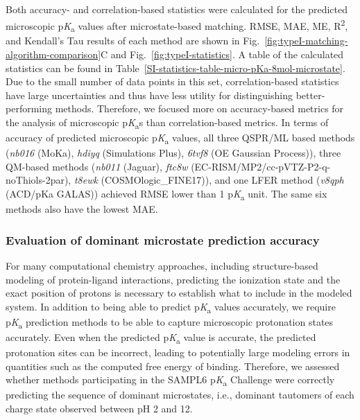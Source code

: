 \documentclass[9pt,lineno,final]{elife}
\newcommand{\pKa}{p\textit{K}\textsubscript{a}}
\begin{document}
Both accuracy- and correlation-based statistics were calculated for the predicted microscopic \pKa{} values after microstate-based matching. 
RMSE, MAE, ME, R\textsuperscript{2}, and Kendall's Tau results of each method are shown in Fig.~\ref{fig:typeI-matching-algorithm-comparison}C and Fig.~\ref{fig:typeI-statistics}. 
A table of the calculated statistics can be found in Table~\ref{SI-statistics-table-micro-pKa-8mol-microstate}. 
Due to the small number of data points in this set, correlation-based statistics have large uncertainties and thus have less utility for distinguishing better-performing methods. 
Therefore, we focused more on accuracy-based metrics for the analysis of microscopic \pKa{}s than correlation-based metrics. 
In terms of accuracy of predicted microscopic \pKa{} values, all three QSPR/ML based methods (\textit{nb016} (MoKa), \textit{hdiyq} (Simulations Plus), \textit{6tvf8} (OE Gaussian Process)), three QM-based methods (\textit{nb011} (Jaguar), \textit{ftc8w} (EC-RISM/MP2/cc-pVTZ-P2-q-noThiols-2par), \textit{t8ewk} (COSMOlogic\_FINE17)), and one LFER method (\textit{v8qph} (ACD/pKa GALAS)) achieved RMSE lower than 1 \pKa{} unit. 
The same six methods also have the lowest MAE.


\subsubsection{Evaluation of dominant microstate prediction accuracy}

For many computational chemistry approaches, including structure-based modeling of protein-ligand interactions, predicting the ionization state and the exact position of protons is necessary to establish what to include in the modeled system.  
In addition to being able to predict \pKa{} values accurately, we require \pKa{} prediction methods to be able to capture microscopic protonation states accurately. 
Even when the predicted \pKa{} value is accurate, the predicted protonation sites can be incorrect, leading to potentially large modeling errors in quantities such as the computed free energy of binding. 
Therefore, we assessed whether methods participating in the SAMPL6 \pKa{} Challenge were correctly predicting the sequence of dominant microstates, i.e., dominant tautomers of each charge state observed between pH 2 and 12.
\end{document}
